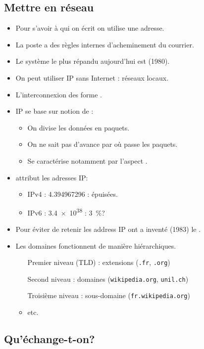 \subsection{Mettre en réseau}
\begin{frame}
	\begin{itemize}
		\item Pour s'avoir à qui on écrit on utilise une adresse.
		\item La poste a des règles internes d'acheminement du courrier.
		\item Le système le plus répandu aujourd'hui est  (1980).
	\end{itemize}
\end{frame}

\begin{frame}
	\begin{itemize}
		\item On peut utiliser IP sans Internet : réseaux locaux.
		\item L'interconnexion des  forme .
		\item IP se base sur notion de :
			\begin{itemize}
				\item On divise les données en paquets.
				\item On ne sait pas d'avance par où passe les paquets.
				\item Se caractérise notamment par l'aspect .
			\end{itemize}
		\item {} attribut les adresses IP:
			\begin{itemize}
				\item IPv4 : \num{4,3 94 967 296} : épuisées.
				\item IPv6 : \num{3,4e38} : \SI{3}{\percent}?
			\end{itemize}
	\end{itemize}

\end{frame}

\begin{frame}
	\begin{itemize}
		\item Pour éviter de retenir les address IP ont a inventé (1983) le .
		\item Les domaines fonctionnent de manière hiérarchiques.
		\begin{itemize}
			\item[Premier niveau (TLD)] : extensions (\verb+.fr+, \verb+.org+)
			\item[Second niveau] : domaines (\verb+wikipedia.org+, \verb+unil.ch+)
			\item[Troisième niveau] : sous-domaine (\verb+fr.wikipedia.org+)
			\item etc.
		\end{itemize}
	\end{itemize}
\end{frame}

\subsection{Qu'échange-t-on?}%